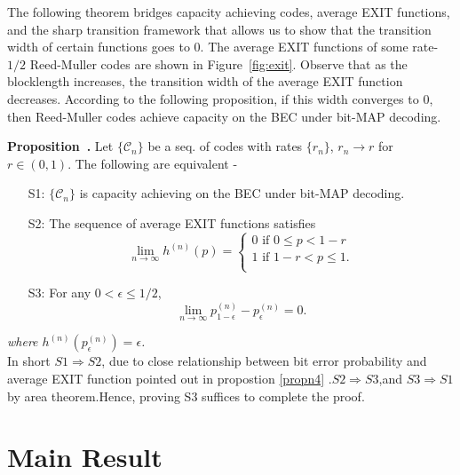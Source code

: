 \documentclass[
10pt, %
a4paper, %
oneside, %
headinclude,footinclude, %
BCOR5mm, %
]{scrartcl}
\newenvironment{proposition}[1][]{\refstepcounter{definition}\par\medskip
   \noindent \textbf{Proposition~\thedefinition. #1} \rmfamily}{\medskip}
\begin{document}
The following theorem bridges capacity achieving codes, average EXIT functions, and the sharp transition framework that allows us to show that the transition width of certain functions goes to $0$. The average EXIT functions of some rate-$1/2$ Reed-Muller codes are shown in Figure~\ref{fig:exit}. Observe that as the blocklength increases, the transition width of the average EXIT function decreases. According to the following proposition, if this width converges to $0$, then Reed-Muller codes achieve capacity on the BEC under bit-MAP decoding.
\begin{proposition}
Let $\{\mathcal{C}_n\}$ be a seq. of codes with rates $\{r_n\}$, $r_n \to r$ for $r \in (0,1)$. The following are equivalent -
\begin{enumerate}
\item[S1:] $\{\mathcal{C}_n\}$ is capacity achieving on the BEC under bit-MAP decoding.
\item[S2:] The sequence of average EXIT functions satisfies
\[
    \lim_{n \to \infty} h^{(n)}(p)=\left\{
                \begin{array}{ll}
                  0 \text{ if } 0 \le p < 1-r\\
                  1 \text{ if } 1-r < p \le 1.\\
                \end{array}
              \right.
  \]
\item[S3:] For any $0 < \epsilon \le 1/2$, $$\lim_{n \to \infty} p_{1-\epsilon}^{(n)} - p_{\epsilon}^{(n)} = 0.$$
\end{enumerate}
\label{propn11}
\end{proposition}
\emph{where $h^{(n)}(p_{\epsilon}^{(n)})=\epsilon$.}\\
In short $S1\Rightarrow S2$, due to close relationship between bit error probability and average EXIT function pointed out in propostion \ref{propn4} .$S2\Rightarrow S3$,and $S3\Rightarrow S1$ by area theorem.Hence, proving S3 suffices to complete the proof.

\section{Main Result}
\end{document}
